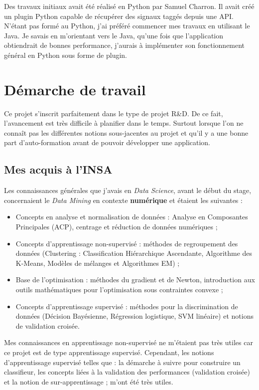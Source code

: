Des travaux initiaux avait été réalisé en Python par Samuel Charron. Il avait créé un plugin Python capable de récupérer des signaux taggés depuis une API. N'étant pas formé au Python, j'ai préféré commencer mes travaux en utilisant le Java. Je savais en m'orientant vers le Java, qu'une fois que l'application obtiendrait de bonnes performance, j'aurais à implémenter son fonctionnement général en Python sous forme de plugin.

\section{Démarche de travail}
    Ce projet s'inscrit parfaitement dans le type de projet R\&D. De ce fait, l'avancement est très difficile à planifier dans le temps. Surtout lorsque l'on ne connaît pas les différentes notions sous-jacentes au projet et qu'il y a une bonne part d'auto-formation avant de pouvoir développer une application.\\

    \subsection{Mes acquis à l'INSA}
        Les connaissances générales que j'avais en \textit{Data Science}, avant le début du stage, concernaient le \textit{Data Mining} en contexte \textbf{numérique} et étaient les suivantes :
        \begin{itemize}
            \item Concepts en analyse et normalisation de données : Analyse en Composantes Principales (ACP), centrage et réduction de données numériques ;
            \item Concepts d'apprentissage non-supervisé : méthodes de regroupement des données (Clustering : Classification Hiérarchique Ascendante, Algorithme des K-Means, Modèles de mélanges et Algorithmes EM) ;
            \item Base de l'optimisation : méthodes du gradient et de Newton, introduction aux outils mathématiques pour l'optimisation sous contraintes convexe ;
            \item Concepts d'apprentissage supervisé : méthodes pour la discrimination de données (Décision Bayésienne, Régression logistique, SVM linéaire) et notions de validation croisée.\\
        \end{itemize}

\color{red}

        Mes connaissances en apprentissage non-supervisé ne m'étaient pas très utiles car ce projet est de type apprentissage supervisé. Cependant, les notions d'apprentissage supervisé telles que : la démarche à suivre pour construire un classifieur, les concepts liées à la validation des performances (validation croisée) et la notion de sur-apprentissage ; m'ont été très utiles.\\

